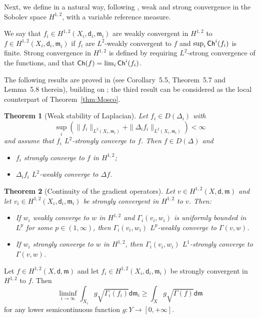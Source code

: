 \documentclass[a4paper,11pt,reqno]{article}
\numberwithin{equation}{section}
\theoremstyle{plain}
\newtheorem{theorem}{Theorem}[section]
\theoremstyle{definition}
\theoremstyle{remark}
\newcommand{\Ch}{{\sf Ch}}
\newcommand{\dist}{\mathsf{d}}
\newcommand{\meas}{\mathfrak{m}}
\begin{document}
Next, we define in a natural way, following \cite{GigliMondinoSavare13}, weak and strong convergence in the Sobolev space $H^{1,2}$,
with a variable reference measure.

\begin{definition}
We say that $f_i\in H^{1,2}(X_i,\dist_i,\meas_i)$ are weakly convergent in $H^{1,2}$ to 
$f\in H^{1,2}(X_i,\dist_i,\meas_i)$ if $f_i$ are $L^2$-weakly convergent to $f$ 
and $\sup_i\Ch^i(f_i)$ is finite. Strong convergence
in $H^{1,2}$ is defined by requiring $L^2$-strong convergence of the functions, and that $\Ch(f)=\lim_i\Ch^i(f_i)$. 
\end{definition}

The following results are proved in \cite{AmbrosioHonda} (see Corollary~5.5, Theorem~5.7 and Lemma~5.8 therein), 
building on \cite{AmbrosioStraTrevisan};  the third result can be considered as the local counterpart
of  Theorem~\ref{thm:Mosco}.

\begin{theorem}[Weak stability of Laplacian]\label{thm:lap}
Let $f_i\in D(\Delta_i)$ with $$\sup_i (\|f_i\|_{L^2(X_i,\meas_i)}+\|\Delta_i f_i\|_{L^2(X_i,\meas_i)})<\infty$$
and assume that $f_i$ $L^2$-strongly converge to $f$. Then $f \in D(\Delta )$ and
\begin{itemize}
\item[(1)] $f_i$ strongly converge to $f$ in $H^{1, 2}$;
\item[(2)]   $\Delta_i f_i$ $L^2$-weakly converge to $\Delta f$.
\end{itemize}
\end{theorem}

\begin{theorem} [Continuity of the gradient operators] \label{thm:cont_reco} 
Let $v\in H^{1,2}(X,\dist,\meas)$ and let $v_i\in H^{1,2}(X_i,\dist_i,\meas_i)$
be strongly convergent in $H^{1,2}$ to $v$. Then:
\begin{itemize} 
\item[(i)] If $w_i$ weakly converge to $w$ in $H^{1,2}$ and $\Gamma_i(v_i,w_i)$ is uniformly bounded
in $L^p$ for some $p\in (1,\infty)$, then $\Gamma_i(v_i, w_i)$ $L^p$-weakly converge to $\Gamma(v,w)$.
\item[(ii)] If $w_i$ strongly converge to $w$ in $H^{1,2}$, then 
$\Gamma_i(v_i, w_i)$ $L^1$-strongly converge to $\Gamma(v,w)$.
\end{itemize} 
\end{theorem}

\begin{lemma}\label{lem:sci}
Let $f \in H^{1,2}(X,\dist,\meas)$ and let $f_i\in H^{1,2}(X_i,\dist_i,\meas_i)$
be strongly convergent in $H^{1,2}$ to $f$. Then
$$
\liminf_{i\to\infty}\int_{X_i} g\sqrt{\Gamma_i(f_i)}\dist\meas_i\geq\int_Xg\sqrt{\Gamma(f)}\dist\meas
$$
for any lower semicontinuous function $g:Y\to [0,+\infty]$.
\end{lemma}
\end{document}
